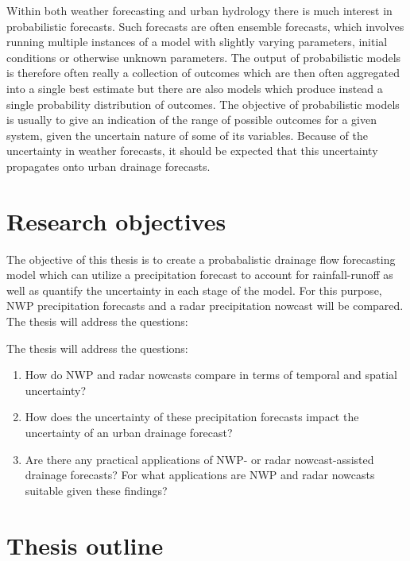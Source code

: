 Within both weather forecasting and urban hydrology there is much interest in probabilistic forecasts. Such forecasts are often ensemble forecasts, which involves running multiple instances of a model with slightly varying parameters, initial conditions or otherwise unknown parameters. The output of probabilistic models is therefore often really a collection of outcomes which are then often aggregated into a single best estimate but there are also models which produce instead a single probability distribution of outcomes. The objective of probabilistic models is usually to give an indication of the range of possible outcomes for a given system, given the uncertain nature of some of its variables. Because of the uncertainty in weather forecasts, it should be expected that this uncertainty propagates onto urban drainage forecasts. 


\section{Research objectives}
The objective of this thesis is to create a probabalistic drainage flow forecasting model which can utilize a precipitation forecast to account for rainfall-runoff as well as quantify the uncertainty in each stage of the model. For this purpose, NWP precipitation forecasts and a radar precipitation nowcast will be compared. 
The thesis will address the questions:


The thesis will address the questions:

\begin{enumerate}
  \item How do NWP and radar nowcasts compare in terms of temporal and spatial uncertainty?
  \item How does the uncertainty of these precipitation forecasts impact the uncertainty of an urban drainage forecast?
  \item Are there any practical applications of NWP- or radar nowcast-assisted drainage forecasts? 
  For what applications are NWP and radar nowcasts suitable given these findings?
\end{enumerate}



\section{Thesis outline}


